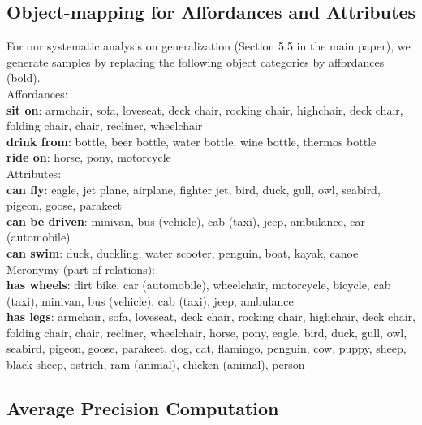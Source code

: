 \documentclass[10pt,twocolumn,letterpaper]{article}
\begin{document}
\subsection*{Object-mapping for Affordances and Attributes}
\label{sec:object_mapping}

For our systematic analysis on generalization (Section 5.5 in the main paper), we generate samples by replacing the following object categories by affordances (bold). 
\\

\noindent Affordances:\\
\textbf{{sit on}}: armchair, sofa, loveseat, deck chair, rocking chair, highchair, deck chair, folding chair, chair, recliner, wheelchair\\
\textbf{{drink from}}: bottle, beer bottle, water bottle, wine bottle, thermos bottle\\
\textbf{{ride on}}: horse, pony, motorcycle\\

\noindent Attributes:\\
\textbf{{can fly}}: eagle, jet plane, airplane, fighter jet, bird, duck, gull, owl, seabird, pigeon, goose, parakeet\\
\textbf{{can be driven}}: minivan, bus (vehicle), cab (taxi), jeep, ambulance, car (automobile)\\
\textbf{{can swim}}: duck, duckling, water scooter, penguin, boat, kayak, canoe\\

\noindent Meronymy (part-of relations):\\
\textbf{{has wheels}}: dirt bike, car (automobile), wheelchair, motorcycle, bicycle, cab (taxi), minivan, bus (vehicle), cab (taxi), jeep, ambulance\\
\textbf{{has legs}}: armchair, sofa, loveseat, deck chair, rocking chair, highchair, deck chair, folding chair, chair, recliner, wheelchair, horse, pony, eagle, bird, duck, gull, owl, seabird, pigeon, goose, parakeet, dog, cat, flamingo, penguin, cow, puppy, sheep, black sheep, ostrich, ram (animal), chicken (animal), person\\


\subsection*{Average Precision Computation}
\end{document}
